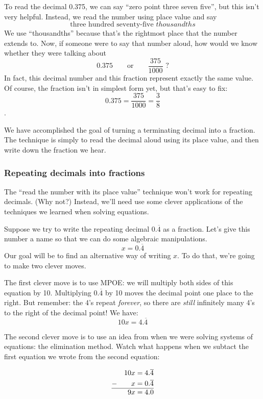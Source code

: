 To read the decimal 0.375, we can say ``zero point three seven five'', but this isn't very helpful. Instead, we read the number using place value and say \[\text{three hundred seventy-five }thousandths\]
We use ``thousandths'' because that's the rightmost place that the number extends to. Now, if someone were to say that number aloud, how would we know whether they were talking about \[0.375 \qquad\text{or}\qquad\frac{375}{1000}\text{  ?}\] In fact, this decimal number and this fraction represent exactly the same value. Of course, the fraction isn't in simplest form yet, but that's easy to fix: \[0.375 = \frac{375}{1000} = \frac{3}{8}\].

We have accomplished the goal of turning a terminating decimal into a fraction. The technique is simply to read the decimal aloud using its place value, and then write down the fraction we hear.

\subsubsection{Repeating decimals into fractions}

The ``read the number with its place value'' technique won't work for repeating decimals. (Why not?) Instead, we'll need use some clever applications of the techniques we learned when solving equations.

Suppose we try to write the repeating decimal $0.\overline{4}$ as a fraction. Let's give this number a name so that we can do some algebraic manipulations. \[x = 0.\overline{4}\] Our goal will be to find an alternative way of writing $x$. To do that, we're going to make two clever moves.

The first clever move is to use MPOE: we will multiply both sides of this equation by 10. Multiplying $0.\overline{4}$ by 10 moves the decimal point one place to the right. But remember: the 4's repeat \textit{forever}, so there are \textit{still} infinitely many 4's to the right of the decimal point! We have: \[10x = 4.\overline{4}\]

The second clever move is to use an idea from when we were solving systems of equations: the elimination method. Watch what happens when we subtact the first equation we wrote from the second equation:

\[\begin{aligned}
	&&	10x &= 4.\overline{4}\\
- 	&& 	x 	&= 0.\overline{4}\\\hline
	&&	9x 	&= 4.0
\end{aligned}\]

